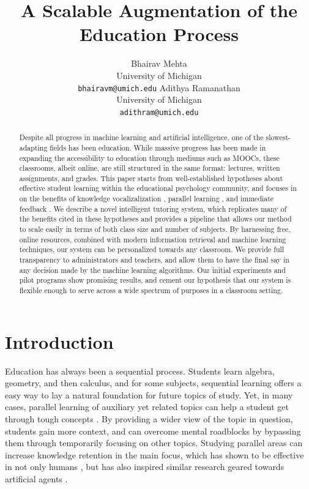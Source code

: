 \documentclass[11pt,a4paper]{article}
\title{A Scalable Augmentation of the Education Process}
\author{Bhairav Mehta \\
  University of Michigan \\
  {\tt bhairavm@umich.edu}
  \And
  Adithya Ramanathan \\
  University of Michigan \\
  {\tt adithram@umich.edu}}
\date{}
\begin{document}
\maketitle
\begin{abstract}
  Despite all progress in machine learning and artificial intelligence, one of the slowest-adapting fields has been education. While massive progress has been made in expanding the accessibility to education through mediums such as MOOCs, these classrooms, albeit online, are still structured in the same format: lectures, written assignments, and grades. This paper starts from well-established hypotheses about effective student learning within the educational psychology community, and focuses in on the benefits of knowledge vocalizalization \cite{TODO}, parallel learning \cite{TODO}, and immediate feedback \cite{TODO}. We describe a novel intelligent tutoring system, which replicates many of the benefits cited in these hypotheses and provides a pipeline that allows our method to scale easily in terms of both class size and number of subjects. By harnessing free, online resources, combined with modern information retrieval and machine learning techniques, our system can be personalized towards any classroom. We provide full transparency to administrators and teachers, and allow them to have the final say in any decision made by the machine learning algorithms. Our initial experiments and pilot programs show promising results, and cement our hypothesis that our system is flexible enough to serve across a wide spectrum of purposes in a classroom setting.
\end{abstract}

\section{Introduction}

Education has always been a sequential process. Students learn algebra, geometry, and then calculus, and for some subjects, sequential learning offers a easy way to lay a natural foundation for future topics of study. Yet, in many cases, parallel learning of auxiliary yet related topics can help a student get through tough concepts \cite{TODO}. By providing a wider view of the topic in question, students gain more context, and can overcome mental roadblocks by bypassing them through temporarily focusing on other topics. Studying parallel areas can increase knowledge retention in the main focus, which has shown to be effective in not only humans \cite{TODO}, but has also inspired similar research geared towards artificial agents \cite{TODO}.
\end{document}
